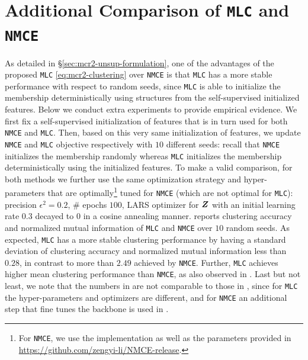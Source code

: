 \documentclass[10pt,twocolumn,letterpaper]{article}
\newcommand{\ours}{MLC}
\newcommand{\mours}{\texttt{\ours}}
\begin{document}
   \section{Additional Comparison of \bf{\mours{}} and \bf{\texttt{NMCE}}}\label{sec:appendix-nmce}
   As detailed in \S \ref{sec:mcr2-unsup-formulation}, one of the advantages of the proposed \mours{} \eqref{eq:mcr2-clustering} over \texttt{NMCE} \cite{Li2022-vq} is that \mours{} has a more stable performance with respect to random seeds, since \mours{} is able to initialize the membership deterministically using structures from the self-supervised initialized features. Below we conduct extra experiments to provide empirical evidence. We first fix a self-supervised initialization of features that is in turn used for both \texttt{NMCE} and \mours{}. Then, based on this very same initialization of features, we update \texttt{NMCE} and \mours{} objective respectively with $10$ different seeds: recall that \texttt{NMCE} initializes the membership randomly whereas \mours{} initializes the membership deterministically using the initialized features. To make a valid comparison, for both methods we further use the same optimization strategy and hyper-parameters that are optimally\footnote{For \texttt{NMCE}, we use the implementation as well as the parameters provided in \scriptsize{\url{https://github.com/zengyi-li/NMCE-release}}.} tuned for \texttt{NMCE} (which are not optimal for \mours{}): precision $\epsilon^2=0.2$, \# epochs $100$, LARS optimizer for ${\bm{Z}}$ with an initial learning rate $0.3$ decayed to $0$ in a cosine annealing manner.  reports clustering accuracy and normalized mutual information of \mours{} and \texttt{NMCE} over $10$ random seeds. As expected, \mours{} has a more stable clustering performance by having a standard deviation of clustering accuracy and normalized mutual information less than $0.28$, in contrast to more than $2.49$ achieved by \texttt{NMCE}. Further, \mours{} achieves higher mean clustering performance than \texttt{NMCE}, as also observed in . Last but not least, we note that the numbers in  are not comparable to those in , since for \mours{} the hyper-parameters and optimizers are different, and for \texttt{NMCE} an additional step that fine tunes the backbone is used in .
   
   
   
   
   
   
   
\end{document}
